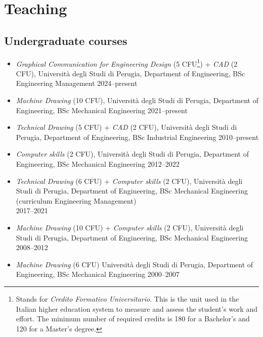 \documentclass[11pt]{article}
\begin{document}
\section*{Teaching}

\subsection*{Undergraduate courses}

\begin{itemize}	
	\item \emph{Graphical Communication for Engineering Design} (5 CFU\footnote{Stands for \emph{Credito Formativo Universitario}. This is the unit used in the Italian higher education system to measure and assess the student's work and effort. The minimum number of required credits is 180 for a Bachelor's and 120 for a Master's degree.}) + \emph{CAD} (2 CFU), Università degli Studi di Perugia, Department of Engineering, BSc Engineering Management \mbox{} \hfill 2024--present
	
		\item \emph{Machine Drawing} (10 CFU), Università degli Studi di Perugia, Department of Engineering, BSc Mechanical Engineering \mbox{} \hfill 2021--present

	\item \emph{Technical Drawing} (5 CFU) + \emph{CAD} (2 CFU), Università degli Studi di Perugia, Department of Engineering, BSc Industrial Engineering \mbox{} \hfill 2010--present
	
\item \emph{Computer skills} (2 CFU), Università degli Studi di Perugia, Department of Engineering, BSc Mechanical Engineering \mbox{} \hfill 2012--2022

	\item \emph{Technical Drawing} (6 CFU) + \emph{Computer skills} (2 CFU), Università degli Studi di Perugia, Department of Engineering, BSc Mechanical Engineering (curriculum Engineering Management) \\ \mbox{} \hfill 2017--2021
	
	\item \emph{Machine Drawing} (10 CFU) + \emph{Computer skills} (2 CFU), Università degli Studi di Perugia, Department of Engineering, BSc Mechanical Engineering \mbox{} \hfill 2008--2012

	\item \emph{Machine Drawing} (6 CFU) Università degli Studi di Perugia, Department of Engineering, BSc Mechanical Engineering \mbox{} \hfill 2000--2007
	

\end{itemize}
\end{document}
